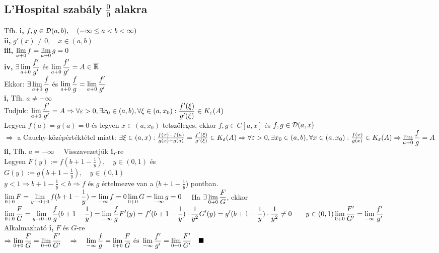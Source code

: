 \documentclass[a4paper,11pt]{article}
\begin{document}
\subsection{L'Hospital szabály $\frac{0}{0}$ alakra}
\tetel Tfh. \textbf{i,} $f,g\in\displaystyle\mathcal{D}(a,b),\quad(-\infty\leq a<b<\infty)$\\[0.2cm]\hspace*{2cm}
\textbf{ii,} $g'(x)\neq0,\quad x\in(a,b)$\\[0.2cm]\hspace*{2.1cm}\textbf{iii,} $\displaystyle\lim_{a+0} f=\displaystyle\lim_{a+0}
g=0$\\[0.2cm]\hspace*{2.1cm}\textbf{iv,} $\exists\displaystyle\lim_{a+0} \frac{f'}{g'}$ és
$\displaystyle\lim_{a+0}\frac{f'}{g'}=A\in\overline{\mathbb{R}}$\\[0.2cm] Ekkor: $\exists\displaystyle\lim_{a+0} \frac{f}{g}$ és
$\displaystyle\lim_{a+0}\frac{f}{g}=\displaystyle\lim_{a+0}\frac{f'}{g'}$\\[0.2cm]\biz\textbf{i,} Tfh.
$a\neq-\infty$\\[0.2cm]Tudjuk: $\displaystyle\lim_{a+0}\frac{f'}{g'}=A\Rightarrow\forall \varepsilon>0,
\exists x_0\in(a,b),\forall\xi\in(a,x_0):\frac{f'(\xi)}{g'(\xi)}
\in K_{\varepsilon}(A)$\\[0.2cm]Legyen $f(a)=g(a)=0$ és legyen $x\in(a,x_0)$
tetszőleges, ekkor $f,g\in C[a,x]$ és $f,g\in\displaystyle\mathcal{D}(a,x)$\\[0.2cm]$\Rightarrow$ a
Cauchy-középértéktétel miatt: $\exists\xi\in(a,x):\frac{f(x)-f(a)}{g(x)-g(a)}=
\frac{f'(\xi)}{g'(\xi)}\in K_{\varepsilon}(A)\\[0.2cm]\Rightarrow\forall\varepsilon >0,\exists
x_0\in(a,b),\forall x\in(a,x_0):\frac{f(x)}{g(x)}\in K_{\varepsilon}(A)
\Rightarrow\displaystyle\lim_{a+0}\frac{f}{g}=A$\\[0.2cm]\textbf{ii,} Tfh. $a=-\infty\quad$
Visszavezetjük \textbf{i,}-re\\[0.1cm]Legyen $F(y):=f(b+1-\frac{1}{y}),\quad
y\in(0,1)$ és\\[0.1cm]$G(y):=g(b+1-\frac{1}{y}),\quad y\in(0,1)$\\[0.1cm]$y<1
\Rightarrow b+1-\frac{1}{y}<b\Rightarrow f\text{ és }g$ értelmezve van a
($b+1- \frac{1}{y}$) pontban.\\[0.1cm]$\displaystyle\lim_{0+0} F=\lim\limits_{y\to0+0}f(b+1-
\frac{1}{y})=\lim\limits_{-\infty} f=0\\[0.2cm]\displaystyle\lim_{0+0} G=\lim\limits_{-\infty}
g=0\quad$ Ha $\exists\displaystyle\lim_{0+0}\frac{F}{G}$, ekkor\\[0.2cm]$
\displaystyle\lim_{0+0}\frac{F}{G}=\lim\limits_{y\to0+0}\frac{f}{g}(b+1-\frac{1}{y})=
\lim\limits_{-\infty}\frac{f}{g}\\[0.2cm]F'(y)=f'(b+1-\frac{1}{y})\cdot
\frac{1}{y^2}\\[0.2cm]G'(y)=g'(b+1-\frac{1}{y})\cdot\frac{1}{y^2}
\neq0\quad\quad y\in(0,1)\\[0.2cm]\displaystyle\lim_{0+0}\frac{F'}{G'}= \lim\limits_{-\infty}\frac{f'}{g'}\hspace{1.5cm}$ Alkalmazható \textbf{i,}
$F$ és $G$-re\\[0.2cm]$\Rightarrow\displaystyle\lim_{0+0}\frac{F}{G}=\displaystyle\lim_{0+0}\frac{F'}{G'}
\quad\Rightarrow\quad\lim\limits_{-\infty}\frac{f}{g}=\displaystyle\lim_{0+0}\frac{F}{G} \text{ és }
\lim\limits_{-\infty}\frac{f'}{g'}=\displaystyle\lim_{0+0}
\frac{F'}{G'}\quad\blacksquare$\newpage
\end{document}
